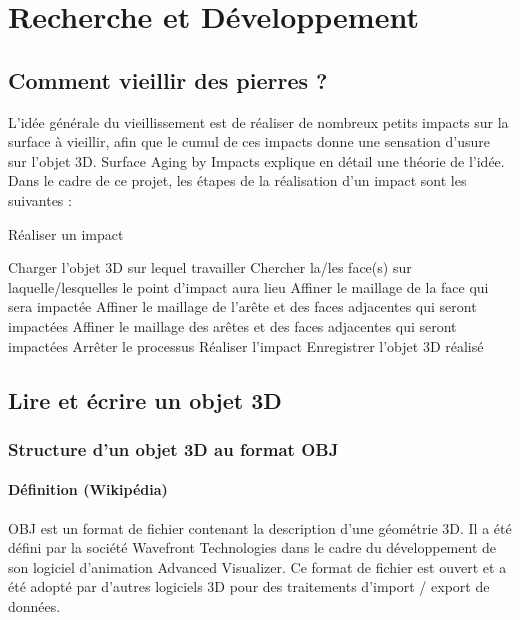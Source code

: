 \documentclass[a4paper,french]{report}
\begin{document}
	\chapter{Recherche et Développement}
		\section{Comment vieillir des pierres ?}
			L'idée générale du vieillissement est de réaliser de nombreux petits impacts sur la surface à vieillir, afin que le cumul de ces impacts donne une sensation d'usure sur l'objet 3D. Surface Aging by Impacts \cite{PPD01} explique en détail une théorie de l'idée. Dans le cadre de ce projet, les étapes de la réalisation d'un impact sont les suivantes : 
			\begin{algorithm}[H]
				\caption{Réaliser un impact}
				\begin{algorithmic}[1]
					\STATE Charger l'objet 3D sur lequel travailler
					\REPEAT
						\REPEAT
							\STATE Chercher la/les face(s) sur laquelle/lesquelles le point d'impact aura lieu
								\STATE Affiner le maillage de la face qui sera impactée
								\STATE Affiner le maillage de l'arête et des faces adjacentes qui seront impactées
								\STATE Affiner le maillage des arêtes et des faces adjacentes qui seront impactées
							\ELSE
								\STATE Arrêter le processus
							\ENDIF
						\STATE Réaliser l'impact
					\STATE Enregistrer l'objet 3D réalisé
				\end{algorithmic}
			\end{algorithm}
			
			
		\section{Lire et écrire un objet 3D}
			\subsection{Structure d'un objet 3D au format OBJ}
				\subsubsection{Définition (Wikipédia)}
				OBJ est un format de fichier contenant la description d'une géométrie 3D. Il a été défini par la société Wavefront Technologies dans le cadre du développement de son logiciel d'animation Advanced Visualizer. Ce format de fichier est ouvert et a été adopté par d'autres logiciels 3D pour des traitements d'import / export de données.
\end{document}
